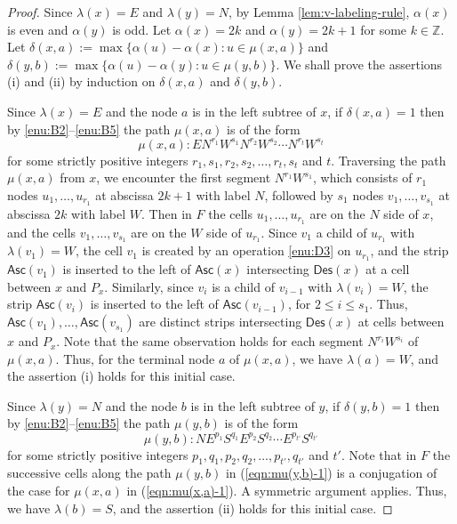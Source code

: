 \documentclass[a4paper,11pt,reqno]{amsart}
\theoremstyle{definition}
\numberwithin{equation}{section}
\newcommand{\ZZ}{{\mathbb{Z}}}
\newcommand{\Des}{{\textsf{Des}}}
\newcommand{\Asc}{{\textsf{Asc}}}
\begin{document}
\begin{proof} Since $\lambda(x)=E$ and $\lambda(y)=N$, by Lemma \ref{lem:v-labeling-rule}, $\alpha(x)$ is even and $\alpha(y)$ is odd.  Let $\alpha(x)=2k$ and $\alpha(y)=2k+1$ for some $k\in\ZZ$. Let $\delta(x,a):= \max\{\alpha(u)-\alpha(x): u\in \mu(x,a)\}$ and $\delta(y,b):=\max\{\alpha(u)-\alpha(y): u\in \mu(y,b)\}$.
We shall prove the assertions (i) and (ii) by induction on $\delta(x,a)$ and $\delta(y,b)$.  

Since $\lambda(x)=E$ and the node $a$ is in the left subtree of $x$, if $\delta(x,a)=1$ then by \ref{enu:B2}--\ref{enu:B5} the path $\mu(x,a)$ is of the form 
\begin{equation} \label{eqn:mu(x,a)-1}
\mu(x,a): EN^{r_1}W^{s_1}N^{r_2}W^{s_2}\cdots N^{r_t}W^{s_t}
\end{equation}
for some strictly positive integers $r_1,s_1,r_2,s_2,\dots,r_t,s_t$ and $t$. Traversing the path $\mu(x,a)$ from $x$, we encounter the first segment $N^{r_1}W^{s_1}$, which consists of $r_1$ nodes $u_1, \dots,u_{r_1}$ at abscissa $2k+1$ with label $N$, followed by $s_1$ nodes $v_1,\dots,v_{s_1}$ at abscissa $2k$ with label $W$. Then in $F$ the cells $u_1,\dots,u_{r_1}$ are on the $N$ side of $x$, and the cells $v_1,\dots,v_{s_1}$ are on the $W$ side of $u_{r_1}$. Since $v_1$ a child of $u_{r_1}$ with $\lambda(v_1)=W$, the cell $v_1$ is created by an operation \ref{enu:D3} on $u_{r_1}$, and the strip $\Asc(v_1)$ is inserted to the left of $\Asc(x)$ intersecting $\Des(x)$ at a cell between $x$ and $P_x$. Similarly, since $v_i$ is a child of $v_{i-1}$ with $\lambda(v_i)=W$, the strip $\Asc(v_i)$ is inserted to the left of $\Asc(v_{i-1})$, for $2\le i\le s_1$. Thus, $\Asc(v_1),\dots,\Asc(v_{s_1})$ are distinct strips intersecting $\Des(x)$ at cells between $x$ and $P_x$. Note that the same observation holds for each segment $N^{r_i}W^{s_i}$ of $\mu(x,a)$. Thus, for the terminal node $a$ of $\mu(x,a)$, we have $\lambda(a)=W$, and the assertion (i) holds for this initial case.

Since $\lambda(y)=N$ and the node $b$ is in the left subtree of $y$, if $\delta(y,b)=1$ then by \ref{enu:B2}--\ref{enu:B5} the path $\mu(y,b)$ is of the form
\begin{equation} \label{eqn:mu(y,b)-1}
\mu(y,b): NE^{p_1}S^{q_1}E^{p_2}S^{q_2}\cdots E^{p_{t'}}S^{q_{t'}}
\end{equation}
for some strictly positive integers $p_1,q_1,p_2,q_2,\dots,p_{t'},q_{t'}$ and $t'$. Note that in $F$ the successive cells along the path $\mu(y,b)$ in (\ref{eqn:mu(y,b)-1}) is a conjugation of the case for $\mu(x,a)$ in (\ref{eqn:mu(x,a)-1}). A symmetric argument applies. Thus, we have $\lambda(b)=S$, and the assertion (ii) holds for this initial case.



\end{proof}
\end{document}
